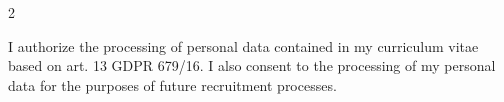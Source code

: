 \documentclass[darkhipster]{simplehipstercv}
\begin{document}
\begin{paracol}{2}
\vfill{} %

\setlength{\parindent}{0pt}
\begin{minipage}[t]{0.75\textwidth}
\fontfamily{\sfdefault}\selectfont \color{black!70}
{I authorize the processing of personal data contained in my curriculum vitae based on art. 13 GDPR 679/16. I also consent to the processing of my personal data for the purposes of future recruitment processes.
}
\newline
\newline
\newline

\end{minipage}

\end{paracol}
\end{document}
